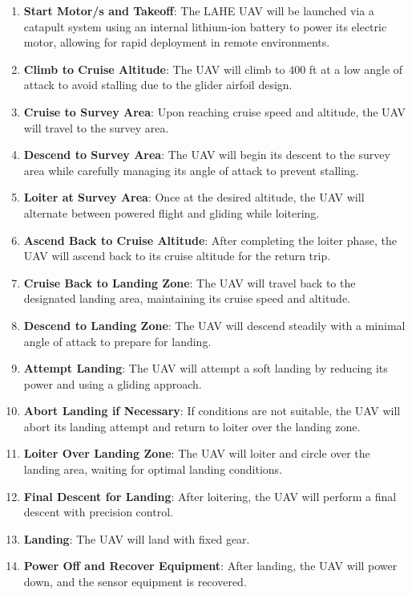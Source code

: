 \documentclass[12pt]{article}
\begin{document}
	\begin{enumerate}
		\item \textbf{Start Motor/s and Takeoff}: The LAHE UAV will be launched via a catapult system using an internal lithium-ion battery to power its electric motor, allowing for rapid deployment in remote environments.
		
		\item \textbf{Climb to Cruise Altitude}: The UAV will climb to 400 ft at a low angle of attack to avoid stalling due to the glider airfoil design.
		
		\item \textbf{Cruise to Survey Area}: Upon reaching cruise speed and altitude, the UAV will travel to the survey area.
		
		\item \textbf{Descend to Survey Area}: The UAV will begin its descent to the survey area while carefully managing its angle of attack to prevent stalling.
		
		\item \textbf{Loiter at Survey Area}: Once at the desired altitude, the UAV will alternate between powered flight and gliding while loitering.
		
		\item \textbf{Ascend Back to Cruise Altitude}: After completing the loiter phase, the UAV will ascend back to its cruise altitude for the return trip.
		
		\item \textbf{Cruise Back to Landing Zone}: The UAV will travel back to the designated landing area, maintaining its cruise speed and altitude.
		
		\item \textbf{Descend to Landing Zone}: The UAV will descend steadily with a minimal angle of attack to prepare for landing.
		
		\item \textbf{Attempt Landing}: The UAV will attempt a soft landing by reducing its power and using a gliding approach.
		
		\item \textbf{Abort Landing if Necessary}: If conditions are not suitable, the UAV will abort its landing attempt and return to loiter over the landing zone.
		
		\item \textbf{Loiter Over Landing Zone}: The UAV will loiter and circle over the landing area, waiting for optimal landing conditions.
		
		\item \textbf{Final Descent for Landing}: After loitering, the UAV will perform a final descent with precision control.
		
		\item \textbf{Landing}: The UAV will land with fixed gear.
		
		\item \textbf{Power Off and Recover Equipment}: After landing, the UAV will power down, and the sensor equipment is recovered.
	\end{enumerate}
	
\end{document}
